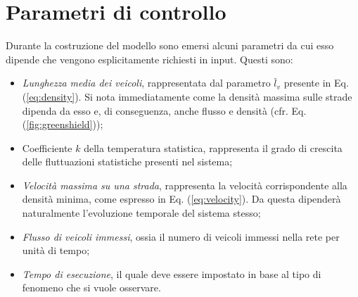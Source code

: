 \documentclass[../main.tex]{subfiles}
\begin{document}
\section{Parametri di controllo}
Durante la costruzione del modello sono emersi alcuni parametri da cui esso dipende che vengono esplicitamente richiesti in input.
Questi sono:
\begin{itemize}
    \item \emph{Lunghezza media dei veicoli}, rappresentata dal parametro $\bar{l}_v$ presente in Eq. (\ref{eq:density}).
        Si nota immediatamente come la densit\`a massima sulle strade dipenda da esso e, di conseguenza, anche flusso e densit\`a (cfr. Eq. (\ref{fig:greenshield}));
    \item Coefficiente $k$ della temperatura statistica, rappresenta il grado di crescita delle fluttuazioni statistiche presenti nel sistema;
    \item \emph{Velocit\`a massima su una strada}, rappresenta la velocit\`a corrispondente alla densit\`a minima, come espresso in Eq. (\ref{eq:velocity}).
        Da questa dipender\`a naturalmente l'evoluzione temporale del sistema stesso;
    \item \emph{Flusso di veicoli immessi}, ossia il numero di veicoli immessi nella rete per unit\`a di tempo;
    \item \emph{Tempo di esecuzione}, il quale deve essere impostato in base al tipo di fenomeno che si vuole osservare.
\end{itemize}
\end{document}
